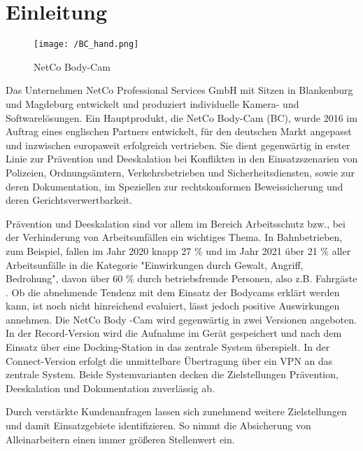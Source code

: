\documentclass[thesis.tex]{subfiles}
\begin{document}
\chapter{Einleitung}
\label{chap:Einleitung}

\begin{figure}[h]
    \centering
    \texttt{[image: /BC\_hand.png]}
    \caption{NetCo Body-Cam}
    \label{fig:BC}
\end{figure}

Das Unternehmen NetCo Professional Services GmbH mit Sitzen in Blankenburg und Magdeburg entwickelt und produziert individuelle Kamera- und Softwarelösungen.
Ein Hauptprodukt, die NetCo Body-Cam (BC), wurde 2016 im Auftrag eines englischen Partners entwickelt, für den deutschen Markt angepasst und inzwischen europaweit erfolgreich vertrieben.
Sie dient gegenwärtig in erster Linie zur Prävention und Deeskalation bei Konflikten in den Einsatzszenarien von Polizeien, Ordnungsämtern, Verkehrsbetrieben und Sicherheitsdiensten, sowie zur deren Dokumentation, im Speziellen zur rechtskonformen Beweissicherung und deren Gerichtsverwertbarkeit.

Prävention und Deeskalation sind vor allem im Bereich Arbeitsschutz bzw., bei der Verhinderung von Arbeitsunfällen ein wichtiges Thema.
In Bahnbetrieben, zum Beispiel, fallen im Jahr 2020 knapp 27 \% und im Jahr 2021 über 21 \% aller Arbeitsunfälle in die Kategorie "Einwirkungen durch Gewalt, Angriff, Bedrohung", davon über 60 \% durch betriebsfremde Personen, also z.B. Fahrgäste \cite[vgl. S.87 ff.]{Unfallgeschehen2020,Unfallgeschehen2021}.
Ob die abnehmende Tendenz mit dem Einsatz der Bodycams erklärt werden kann, ist noch nicht hinreichend evaluiert, lässt jedoch positive Auswirkungen annehmen.
Die NetCo Body -Cam wird gegenwärtig in zwei Versionen angeboten.
In der Record-Version wird die Aufnahme im Gerät gespeichert und nach dem Einsatz über eine Docking-Station in das zentrale System überspielt.
In der Connect-Version erfolgt die unmittelbare Übertragung über ein VPN an das zentrale System.
Beide Systemvarianten decken die Zielstellungen Prävention, Deeskalation und Dokumentation zuverlässig ab.

Durch verstärkte Kundenanfragen lassen sich zunehmend weitere Zielstellungen und damit Einsatzgebiete identifizieren.
So nimmt die Absicherung von Alleinarbeitern einen immer größeren Stellenwert ein.
\end{document}
